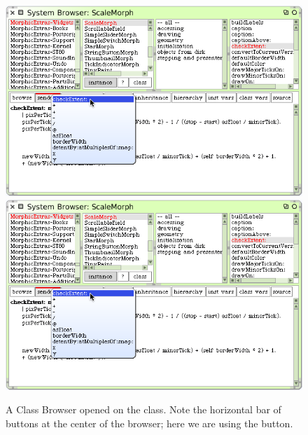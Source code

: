 \documentclass[a4paper,10pt,twoside]{book}
\begin{document}
\begin{figure}[htbp]
	\begin{center}
   \ifluluelse
		{\includegraphics[width=\textwidth]{SendersOfCheckEvent}}
		{\includegraphics[scale=0.7]{SendersOfCheckEvent}}
	\end{center}
	\caption{A Class Browser opened on the  class. Note the horizontal bar of buttons at the center of the browser; here we are using the  button.
	\label{fig:SendersOfCheckEvent}}
\end{figure}
\end{document}
